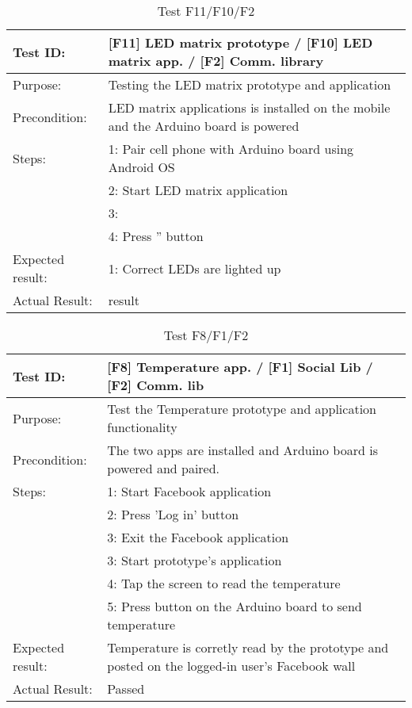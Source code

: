 \begin{table}[h!]
\begin{tabular}{|l|p{10cm}|}
\hline Test ID: &		[F11] LED matrix prototype / [F10] LED matrix app. /
						[F2] Comm. library \\
\hline Purpose: &		Testing the LED matrix prototype and application \\
\hline Precondition: &	LED matrix applications is installed on the mobile and
						the Arduino board is powered \\
\hline
Steps:
 & 1: Pair cell phone with Arduino board using Android OS \\
 & 2: Start LED matrix application \\
 & 3:  \\
 & 4: Press '' button \\
\hline
Expected result:
 & 1: Correct LEDs are lighted up \\
\hline
Actual Result: &  result \\
\hline
\end{tabular}
\caption{Test F11/F10/F2}
\label{tbl:f11f10f2test}
\end{table}


\begin{table}[h!]
\begin{tabular}{|l|p{10cm}|}
\hline Test ID: &		[F8] Temperature app. / [F1] Social Lib / [F2] Comm. lib \\
\hline Purpose: &		Test the Temperature prototype and application
						functionality  \\
\hline Precondition: &	The two apps are installed and Arduino board is powered
						and paired. \\
\hline
Steps:
  & 1: Start Facebook application \\
  & 2: Press 'Log in' button \\
  & 3: Exit the Facebook application \\
  & 3: Start prototype's application \\
  & 4: Tap the screen to read the temperature\\
  & 5: Press button on the Arduino board to send temperature \\
\hline
Expected result:
  & Temperature is corretly read by the prototype and posted on the logged-in
	user's Facebook wall \\
\hline
Actual Result:
  & Passed \\
\hline
\end{tabular}
\caption{Test F8/F1/F2}
\label{tbl:f8f1f2test}
\end{table}


